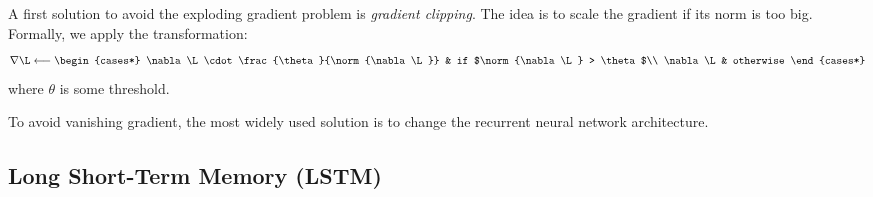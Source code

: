 A first solution to avoid the exploding gradient problem is \emph{gradient clipping}. The idea is to scale the gradient if its norm is too big. Formally, we apply the transformation:
\begin{equation*}
    \nabla\L \longleftarrow \begin{cases*}
        \nabla\L \cdot \frac{\theta}{\norm{\nabla\L}} & if $\norm{\nabla\L} > \theta$\\
        \nabla\L & otherwise
    \end{cases*}
\end{equation*}
where $\theta$ is some threshold.

To avoid vanishing gradient, the most widely used solution is to change the recurrent neural network architecture.

\subsection{Long Short-Term Memory (LSTM)}
